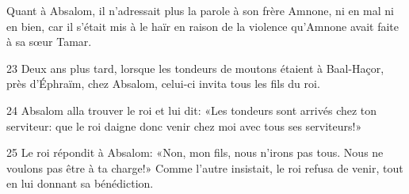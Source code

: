 Quant à Absalom, il n’adressait plus la parole à son frère Amnone, ni en mal ni en bien, car il s’était mis à le haïr en raison de la violence qu’Amnone avait faite à sa sœur Tamar.

23 Deux ans plus tard, lorsque les tondeurs de moutons étaient à Baal-Haçor, près d’Éphraïm, chez Absalom, celui-ci invita tous les fils du roi.

24 Absalom alla trouver le roi et lui dit: «Les tondeurs sont arrivés chez ton serviteur: que le roi daigne donc venir chez moi avec tous ses serviteurs!»

25 Le roi répondit à Absalom: «Non, mon fils, nous n’irons pas tous. Nous ne voulons pas être à ta charge!» Comme l’autre insistait, le roi refusa de venir, tout en lui donnant sa bénédiction.
